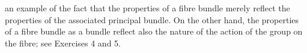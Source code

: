 an example of the fact that the properties of a fibre bundle merely reflect the properties of the associated principal bundle. On the other hand, the properties of a fibre bundle as a bundle reflect also the nature of the action of the group on the fibre; see Exercises 4 and 5.
